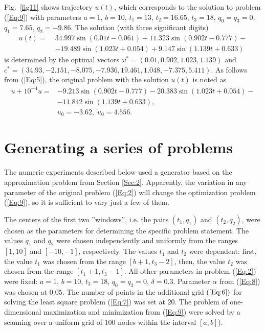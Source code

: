 \documentclass{llncs}
\begin{document}
Fig.~\ref{fig11} shows trajectory $u(t)$, which corresponds to the solution to problem (\ref{Eq:9}) with parameters $a=1$, $b=10$, $t_1=13$, $t_2=16.65$, $t_3=18$, $q_0=q_3=0$, $q_1=7.65$, $q_2=-9.86$. The solution (with three significant digits)
\begin{eqnarray} \nonumber 
u(t)= \; &34.997\sin(0.01t-0.061)+11.323\sin(0.902t-0.777)- \nonumber \\
      &-19.489\sin(1.023t+0.054)+9.147 \sin(1.139t+0.633) \nonumber
\end{eqnarray}
is determined by the optimal vectors $\omega^\ast =(0.01, 0.902 , 1.023, 1.139)$ and $c^\ast=( 34.93, -2.151, -8.075, -7.936, 19.461, 1.048, -7.375, 5.411)$. As follows from (\ref{Eq:5}), the original problem with the solution $u(t)$ is noted as 
\begin{eqnarray} \nonumber 
\ddot{u}+10^{-4}u = & -9.213\sin(0.902t-0.777)-20.383\sin(1.023t+0.054)- \nonumber \\
                    &-11.842 \sin(1.139t+0.633), \nonumber \\
                    &u_0= -3.62, \; \dot{u}_0 = 4.556.\nonumber
\end{eqnarray}


\section{Generating a series of problems}\label{Sec:3}

The numeric experiments described below used a generator based on the approximation problem from Section \ref{Sec:2}. Apparently, the variation in any parameter of the original problem (\ref{Eq:2}) will change the optimization problem (\ref{Eq:9}), so it is sufficient to vary just a few of them.

The centers of the first two ''windows'', i.e. the pairs  $(t_1, q_1)$ and $(t_2, q_2)$, were chosen as the parameters for determining the specific problem statement. The values $q_1$ and $q_2$ were chosen independently and uniformly from the ranges  $[1,10]$ and $[-10, -1]$, respectively. The values $t_1$ and $t_2$ were dependent: first, the value $t_1$ was chosen from the range $[b+1, t_3-2]$, then, the value $t_2$ was chosen from the range $[t_1+1, t_3-1]$. All other parameters in problem (\ref{Eq:2}) were fixed: $a=1$, $b=10$, $t_3=18$, $q_0=q_3=0$, $\delta=0.3$. Parameter $\alpha$ from (\ref{Eq:8}) was chosen at $0.05$. The number of points in the additional grid $(\ref{Eq:6})$ for solving the least square problem (\ref{Eq:7}) was set at $20$. The problem of one-dimensional maximization and minimization from (\ref{Eq:9}) were solved by a scanning over a uniform grid of $100$ nodes within the interval $[a,b]$).
\end{document}
